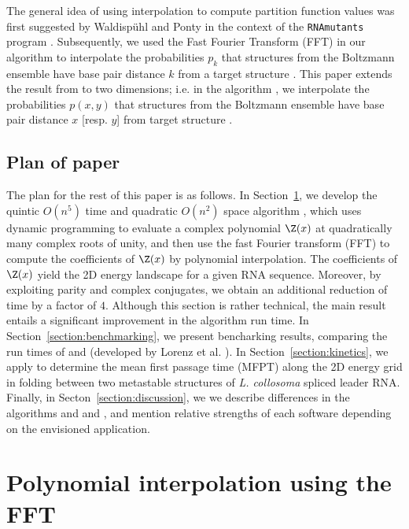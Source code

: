 The general idea of using
interpolation to compute partition function values was first suggested
by Waldisp\"uhl and Ponty in the context of the
{\tt RNAmutants} program \cite{waldispuhlPontyRecomb}. Subsequently,
we used the Fast Fourier Transform (FFT) in our algorithm
\fftbor \cite{fftbor}  to interpolate the
probabilities $p_k$ that structures from the Boltzmann
ensemble have base pair distance $k$ from a target structure \strSt.
This paper extends the result from \cite{fftbor} to two dimensions; i.e.
in the algorithm \ffttwo,
we interpolate the probabilities $p(x,y)$ that
structures from the Boltzmann ensemble have base pair distance
$x$ [resp. $y$] from target structure .

\subsection{Plan of paper}

The plan for the rest of this paper is as follows. In
Section~\ref{section:approach}, we develop the quintic
$O(n^5)$ time and quadratic $O(n^2)$ space algorithm \ffttwo,
which uses dynamic programming to evaluate a complex polynomial
$\Z(x)$ at quadratically many complex roots of unity, and then use the fast
Fourier transform (FFT) to compute the coefficients of $\Z(x)$ by
polynomial interpolation. The coefficients of $\Z(x)$ yield the 2D
energy landscape for a given RNA sequence. Moreover, by exploiting
parity and complex conjugates, we obtain an additional reduction of time
by a factor of $4$. Although this section is rather technical, the
main result entails a significant improvement in the algorithm
run time.
In Section~\ref{section:benchmarking}, we present bencharking results,
comparing the run times of \ffttwo and \rnatwofold
(developed by Lorenz et al.  \cite{hofacker:RNAbor2D}).
In Section~\ref{section:kinetics}, we apply \ffttwo to determine
the mean first passage time (MFPT) along the 2D energy grid in folding
between two metastable structures of {\em L. collosoma} spliced leader
RNA.
Finally, in Secton~\ref{section:discussion}, we we describe
differences in the algorithms \rnatwofold and
and \ffttwo, and mention relative strengths of each software
depending on the envisioned application.

\section{Polynomial interpolation using the FFT}
\label{section:approach}

